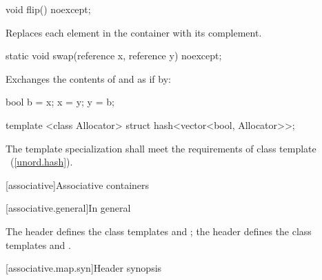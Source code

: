 %
\begin{itemdecl}
void flip() noexcept;
\end{itemdecl}

\begin{itemdescr}
\pnum
\effects Replaces each element in the container with its complement.
\end{itemdescr}

%
\begin{itemdecl}
static void swap(reference x, reference y) noexcept;
\end{itemdecl}

\begin{itemdescr}
\pnum
\effects Exchanges the contents of  and  as if by:

\begin{codeblock}
bool b = x;
x = y;
y = b;
\end{codeblock}

\end{itemdescr}

\begin{itemdecl}
template <class Allocator> struct hash<vector<bool, Allocator>>;
\end{itemdecl}

\begin{itemdescr}
\pnum
The template specialization shall meet the requirements of class template
~(\ref{unord.hash}).
\end{itemdescr}

[associative]{Associative containers}

[associative.general]{In general}

\pnum
The header  defines the class templates  and
; the header  defines the class templates
 and .

[associative.map.syn]{Header  synopsis}


